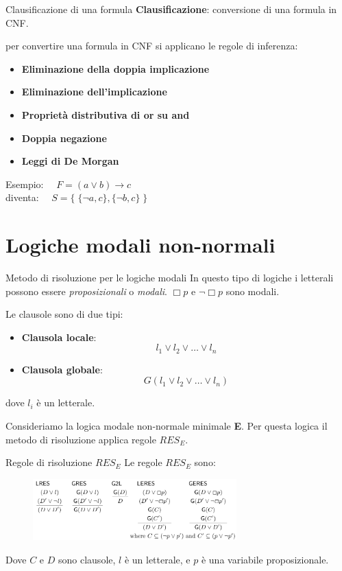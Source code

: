 \documentclass{beamer}
\begin{document}

\begin{frame}{Clausificazione di una formula}
    \textbf{Clausificazione}: conversione di una formula in CNF.
    
    per convertire una formula in CNF si applicano le regole di inferenza:
    \begin{itemize}
    \item \textbf{Eliminazione della doppia implicazione}
    \item \textbf{Eliminazione dell'implicazione}
    \item \textbf{Proprietà distributiva di or su and}
    \item \textbf{Doppia negazione}
    \item \textbf{Leggi di De Morgan}
    \end{itemize}
    Esempio: $\quad F = (a \lor b) \to c$ \\diventa: $\quad S = \{ \; \{\lnot a, c\}, \{\lnot b, c\} \; \}$
\end{frame}

\section{Logiche modali non-normali}
\begin{frame}{Metodo di risoluzione per le logiche modali}
    In questo tipo di logiche i letterali possono essere \emph{proposizionali} o \emph{modali}. $\Box p$ e $\lnot \Box p$ sono modali.

    Le clausole sono di due tipi:
    \begin{itemize}
        \item \textbf{Clausola locale}: \[ l_1 \lor l_2 \lor \ldots \lor l_n \]
        \item \textbf{Clausola globale}: \[ G(l_1 \lor l_2 \lor \ldots \lor l_n) \]
    \end{itemize}
    dove $l_i$ è un letterale.

    Consideriamo la logica modale non-normale minimale \textbf{E}. Per questa logica il metodo di risoluzione applica regole $RES_E$. 
\end{frame}

\begin{frame}{Regole di risoluzione $RES_E$}
    Le regole $RES_E$ sono:
    \begin{figure}
        \centering
        \includegraphics[width=0.7\textwidth, height=0.5\textheight]{assets/res_E.png}
    \end{figure} 
    Dove $C$ e $D$ sono clausole, $l$ è un letterale, e $p$ è una variabile proposizionale.
\end{frame}
\end{document}

